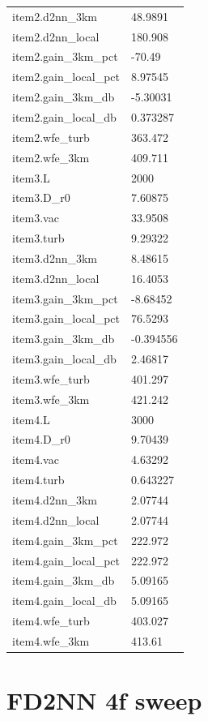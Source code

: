 \begin{longtable}{p{}p{}}
item2.d2nn\_3km & 48.9891\\
item2.d2nn\_local & 180.908\\
item2.gain\_3km\_pct & -70.49\\
item2.gain\_local\_pct & 8.97545\\
item2.gain\_3km\_db & -5.30031\\
item2.gain\_local\_db & 0.373287\\
item2.wfe\_turb & 363.472\\
item2.wfe\_3km & 409.711\\
item3.L & 2000\\
item3.D\_r0 & 7.60875\\
item3.vac & 33.9508\\
item3.turb & 9.29322\\
item3.d2nn\_3km & 8.48615\\
item3.d2nn\_local & 16.4053\\
item3.gain\_3km\_pct & -8.68452\\
item3.gain\_local\_pct & 76.5293\\
item3.gain\_3km\_db & -0.394556\\
item3.gain\_local\_db & 2.46817\\
item3.wfe\_turb & 401.297\\
item3.wfe\_3km & 421.242\\
item4.L & 3000\\
item4.D\_r0 & 9.70439\\
item4.vac & 4.63292\\
item4.turb & 0.643227\\
item4.d2nn\_3km & 2.07744\\
item4.d2nn\_local & 2.07744\\
item4.gain\_3km\_pct & 222.972\\
item4.gain\_local\_pct & 222.972\\
item4.gain\_3km\_db & 5.09165\\
item4.gain\_local\_db & 5.09165\\
item4.wfe\_turb & 403.027\\
item4.wfe\_3km & 413.61\\
\end{longtable}

\section{FD2NN 4f sweep}
